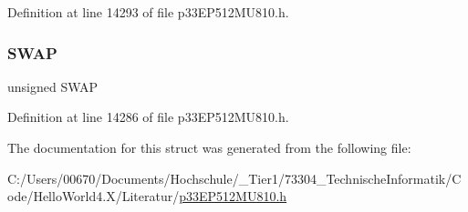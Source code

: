 Definition at line 14293 of file p33\+E\+P512\+M\+U810.\+h.

\mbox{\label{structtag_i_o_c_o_n2_b_i_t_s_a3ed0654ceb192d32e26d2929c9b8dcc2}} 
\subsubsection{\texorpdfstring{S\+W\+AP}{SWAP}}
{\footnotesize\ttfamily unsigned S\+W\+AP}



Definition at line 14286 of file p33\+E\+P512\+M\+U810.\+h.



The documentation for this struct was generated from the following file\+:\begin{DoxyCompactItemize}
\item 
C\+:/\+Users/00670/\+Documents/\+Hochschule/\+\_\+\+Tier1/73304\+\_\+\+Technische\+Informatik/\+Code/\+Hello\+World4.\+X/\+Literatur/\hyperlink{p33_e_p512_m_u810_8h}{p33\+E\+P512\+M\+U810.\+h}\end{DoxyCompactItemize}
